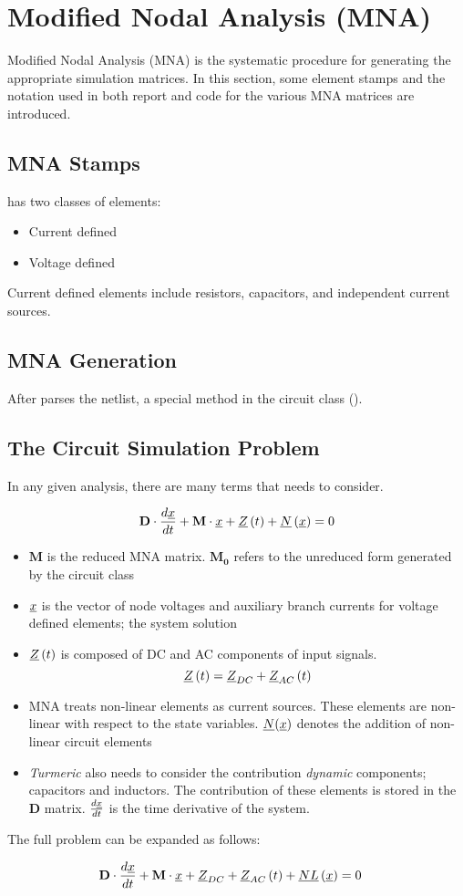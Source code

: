 \section{Modified Nodal Analysis (MNA)}
Modified Nodal Analysis (MNA) is the systematic procedure for generating the appropriate simulation matrices. In this section, some element stamps and the notation used in both report and code for the various MNA matrices are introduced.
\subsection{MNA Stamps}
\turmeric has two classes of elements:
\begin{itemize}
    \item Current defined
    \item Voltage defined
\end{itemize}

Current defined elements include resistors, capacitors, and independent current sources. 

\subsection{MNA Generation}
After \turmeric parses the netlist, a special method in the circuit class ().


\subsection{The Circuit Simulation Problem}
In any given analysis, there are many terms that \turmeric needs to consider.

\begin{equation}
    \mathbf{D}\cdot \frac{d\underline{x}}{dt} + \mathbf{M}\cdot \underline{x} + \underline{Z}\left( t\right) + \underline{N}\left(\underline{x}\right) = 0 \label{eq:problem}
\end{equation}

\begin{itemize}
    \item $\mathbf{M}$ is the reduced MNA matrix. $\mathbf{M_0}$ refers to the unreduced form generated by the circuit class
    \item $\underline{x}$ is the vector of node voltages and auxiliary branch currents for voltage defined elements; the system solution
    \item $\underline{Z}\left( t\right)$ is composed of DC and AC components of input signals. \[ \underline{Z}\left(t\right) = \underline{Z}_{DC} + \underline{Z}_{AC}\left(t \right)\]
    \item MNA treats non-linear elements as current sources. These elements are non-linear with respect to the state variables. $\underline{N}(\underline{x})$ denotes the addition of non-linear circuit elements
    \item \textit{Turmeric} also needs to consider the contribution \textit{dynamic} components; capacitors and inductors. The contribution of these elements is stored in the $\mathbf{D}$ matrix. $\frac{d\underline{x}}{dt}$ is the time derivative of the system.
\end{itemize}

The full problem can be expanded as follows:

\begin{align}
    &\mathbf{D}\cdot \frac{d\underline{x}}{dt} + \mathbf{M}\cdot \underline{x} + \underline{Z}_{DC} + \underline{Z}_{AC}\left( t\right) + \underline{NL}\left(\underline{x}\right) = 0 \label{eq:full}
\end{align}